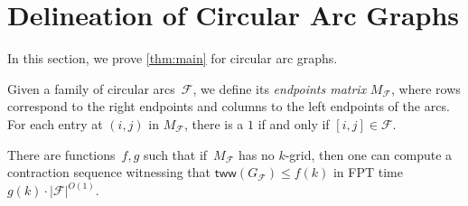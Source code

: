 \documentclass[a4paper,UKenglish,cleveref,thm-restate]{lipics-v2021}
\theoremstyle{remark}
\newcommand{\Fc}{\mathcal{F}}
\newcommand{\tww}{\mathsf{tww}}
\begin{document}
\section{Delineation of Circular Arc Graphs}
\label{sec:cag}
In this section, we prove \cref{thm:main} for circular arc graphs.

Given a family of circular arcs~$\Fc$, we define its \emph{endpoints matrix} $M_\Fc$, where rows correspond to the right endpoints and columns to the left endpoints of the arcs. For each entry at $(i, j)$ in $M_\Fc$, there is a $1$ if and only if $[i, j] \in \Fc$.

\begin{lemma}\label{lem:cag-gridthm}
    There are functions~$f,g$ such that if~$M_\Fc$ has no $k$-grid,
    then one can compute a contraction sequence witnessing that $\tww(G_\Fc) \le f(k)$ in FPT time $g(k) \cdot |\Fc|^{O(1)}$.
\end{lemma}
\end{document}
